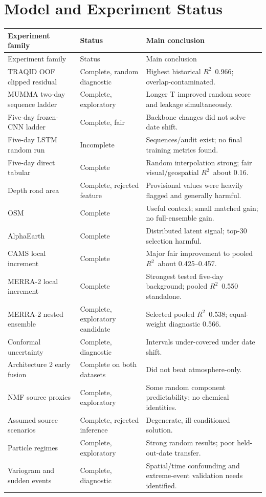 \documentclass[11pt,a4paper,oneside]{report}
\newcommand{\Rtwo}{$R^2$}
\begin{document}
\chapter{Model and Experiment Status}

\begin{longtable}{p{}p{}p{}}
  \toprule
  Experiment family & Status & Main conclusion\\
  \midrule
  \endfirsthead
  \toprule
  Experiment family & Status & Main conclusion\\
  \midrule
  \endhead
  TRAQID OOF clipped residual & Complete, random diagnostic & Highest historical
  \Rtwo\ 0.966; overlap-contaminated.\\
  MUMMA two-day sequence ladder & Complete, exploratory & Longer T improved
  random score and leakage simultaneously.\\
  Five-day frozen-CNN ladder & Complete, fair & Backbone changes did not solve
  date shift.\\
  Five-day LSTM random run & Incomplete & Sequences/audit exist; no final
  training metrics found.\\
  Five-day direct tabular & Complete & Random interpolation strong; fair
  visual/geospatial \Rtwo\ about 0.16.\\
  Depth road area & Complete, rejected feature & Provisional values were heavily
  flagged and generally harmful.\\
  OSM & Complete & Useful context; small matched gain; no full-ensemble gain.\\
  AlphaEarth & Complete & Distributed latent signal; top-30 selection harmful.\\
  CAMS local increment & Complete & Major fair improvement to pooled \Rtwo\
  about 0.425--0.457.\\
  MERRA-2 local increment & Complete & Strongest tested five-day background;
  pooled \Rtwo\ 0.550 standalone.\\
  MERRA-2 nested ensemble & Complete, exploratory candidate & Selected pooled
  \Rtwo\ 0.538; equal-weight diagnostic 0.566.\\
  Conformal uncertainty & Complete, diagnostic & Intervals under-covered under
  date shift.\\
  Architecture 2 early fusion & Complete on both datasets & Did not beat
  atmosphere-only.\\
  NMF source proxies & Complete, exploratory & Some random component
  predictability; no chemical identities.\\
  Assumed source scenarios & Complete, rejected inference & Degenerate,
  ill-conditioned solution.\\
  Particle regimes & Complete, exploratory & Strong random results; poor
  held-out-date transfer.\\
  Variogram and sudden events & Complete, diagnostic & Spatial/time confounding
  and extreme-event validation needs identified.\\
  \bottomrule
\end{longtable}
\end{document}
